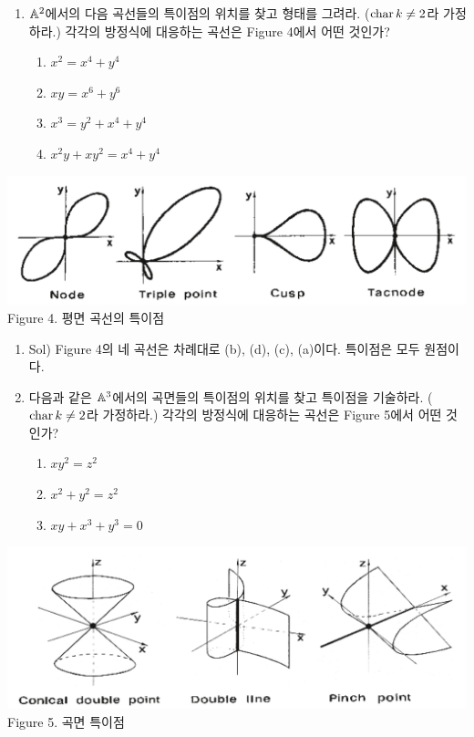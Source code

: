 	\begin{enumerate}[label=\tb{5.\arabic*.},itemindent=0mm,itemsep=4mm]
	\item $\mathbb{A}^2$에서의 다음 곡선들의 특이점의 위치를 찾고 형태를 그려라. ($\operatorname{char} k\ne 2$라 가정하라.)
	각각의 방정식에 대응하는 곡선은 Figure 4에서 어떤 것인가?
	\begin{enumerate}[label=(\alph*)]
	\item $x^2=x^4+y^4$
	\item $xy=x^6+y^6$
	\item $x^3=y^2+x^4+y^4$
	\item $x^2y+xy^2=x^4+y^4$
	\end{enumerate}
	\end{enumerate}
	\begin{center}
	\includegraphics[width=0.8\columnwidth]{Figure4}\\
	Figure 4. 평면 곡선의 특이점
	\end{center}
	\begin{enumerate}[label=,itemindent=0mm]
	\item Sol) Figure 4의 네 곡선은 차례대로 (b), (d), (c), (a)이다. 특이점은 모두 원점이다.\\
	\end{enumerate}
	\begin{enumerate}[label=\tb{5.\arabic*.},itemindent=0mm,itemsep=4mm]
	\setcounter{enumi}{1}
	\item 다음과 같은 $\mathbb{A}^3$에서의 곡면들의 특이점의 위치를 찾고 특이점을 기술하라. ($\operatorname{char} k\ne 2$라 가정하라.)
	각각의 방정식에 대응하는 곡선은 Figure 5에서 어떤 것인가?
	\begin{enumerate}[label=(\alph*)]
	\item $xy^2=z^2$
	\item $x^2+y^2=z^2$
	\item $xy+x^3+y^3=0$
	\end{enumerate}
	\end{enumerate}
	\begin{center}
	\includegraphics[width=0.8\columnwidth]{Figure5}\\
	Figure 5. 곡면 특이점
	\end{center}
